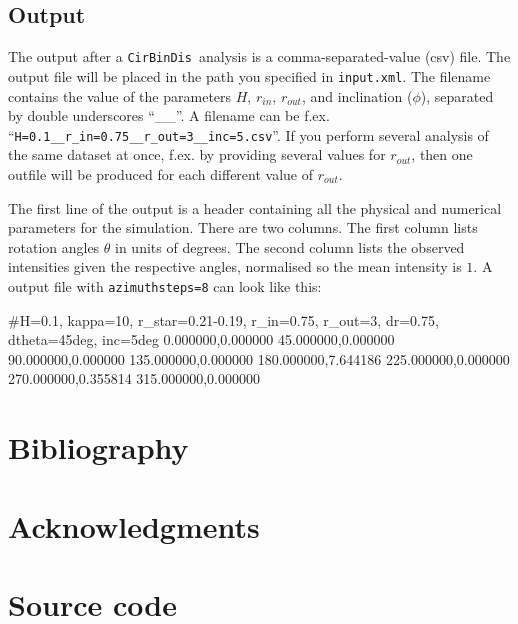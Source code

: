 \documentclass[a4paper, 12pt, english, titlepage]{article}
\newcommand{\sname}{\texttt{CirBinDis }}
\begin{document}
\subsection{Output}
    The output after a \sname analysis is a comma-separated-value (csv) file. The output file will be placed in the path you specified in \texttt{input.xml}. The filename contains the value of the parameters $H$, $r_{in}$, $r_{out}$, and inclination ($\phi$), separated by double underscores ``\_\_''. A filename can be f.ex.
    ``\texttt{H=0.1\_\_r\_in=0.75\_\_r\_out=3\_\_inc=5.csv}''.
    If you perform several analysis of the same dataset at once, f.ex. by providing several values for $r_{out}$, then one outfile will be produced for each different value of $r_{out}$.

    The first line of the output is a header containing all the physical and numerical parameters for the simulation. There are two columns. The first column lists rotation angles $\theta$ in units of degrees. The second column lists the observed intensities given the respective angles, normalised so the mean intensity is $1$. A output file with \texttt{azimuthsteps=8} can look like this:
\begin{verbatim*}
#H=0.1, kappa=10, r_star=0.21-0.19, r_in=0.75, r_out=3, dr=0.75,
dtheta=45deg, inc=5deg
0.000000,0.000000
45.000000,0.000000
90.000000,0.000000
135.000000,0.000000
180.000000,7.644186
225.000000,0.000000
270.000000,0.355814
315.000000,0.000000
\end{verbatim*}



\section{Bibliography}


\section{Acknowledgments}


\section{Source code}
\end{document}
